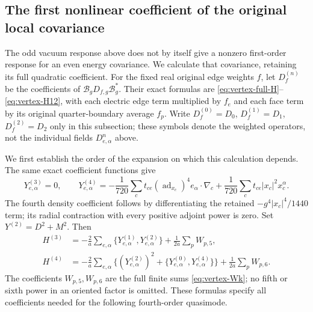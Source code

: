 \subsection{The first nonlinear coefficient of the original local covariance}

The odd vacuum response above does not by itself give a nonzero
first-order response for an even energy covariance. We calculate that
covariance, retaining its full quadratic coefficient. For the fixed
real original edge weights $f$, let $D_f^{(n)}$ be the coefficients
of $\mathcal B_gD_{f,g}\mathcal B_g^*$. Their exact formulas are
\eqref{eq:vertex-full-H}--\eqref{eq:vertex-H12}, with each electric
edge term multiplied by $f_e$ and each face term by its original
quarter-boundary average $f_p$. Write $D_f^{(0)}=D_0$,
$D_f^{(1)}=D_1$, $D_f^{(2)}=D_2$ only in this subsection; these
symbols denote the weighted operators, not the individual fields
$D^n_{e,\alpha}$ above.

We first establish the order of the expansion on which this calculation
depends. The same exact coefficient functions give
\[
 Y^{(3)}_{e,\alpha}=0,\qquad
 Y^{(4)}_{e,\alpha}=
 -\frac1{720}\sum_ct_{ce}(\operatorname{ad}_{x_c})^4e_\alpha
                       \cdot\nabla_c
 +\frac1{720}\sum_ct_{ce}|x_c|^2x_c^\alpha .
\]
The fourth density coefficient follows by differentiating the retained
$-g^4|x_c|^4/1440$ term; its radial contraction with every positive
adjoint power is zero. Set $Y^{(2)}=D^2+M^2$. Then
\begin{align*}
 H^{(3)}&=-\frac2a\sum_{e,\alpha}\{Y^{(1)}_{e,\alpha},Y^{(2)}_{e,\alpha}\}
                             +\frac1{2a}\sum_pW_{p,5},\\
 H^{(4)}&=-\frac2a\sum_{e,\alpha}
       \{(Y^{(2)}_{e,\alpha})^2+
                   \{Y^{(0)}_{e,\alpha},Y^{(4)}_{e,\alpha}\}\}
                             +\frac1{2a}\sum_pW_{p,6}.
\end{align*}
The coefficients $W_{p,5},W_{p,6}$ are the full finite sums
\eqref{eq:vertex-Wk}; no fifth or sixth power in an oriented factor
is omitted. These formulas specify all coefficients needed for the
following fourth-order quasimode.

